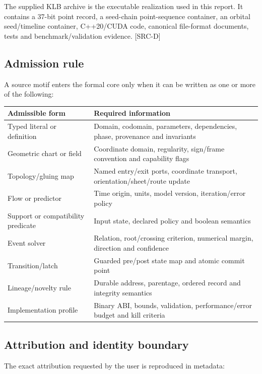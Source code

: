 \documentclass[10pt,a4paper]{article}
\newcommand{\source}[1]{\textsf{\color{TKgray}[#1]}}
\begin{document}
The supplied KLB archive is the executable realization used in this report. It contains a 37-bit point record, a seed-chain point-sequence container, an orbital seed/timeline container, C++20/CUDA code, canonical file-format documents, tests and benchmark/validation evidence. \source{SRC-D}

\subsection{Admission rule}

A source motif enters the formal core only when it can be written as one or more of the following:

\begin{center}
\begin{tabularx}{0.96\textwidth}{@{}YY@{}}
\toprule
\textbf{Admissible form} & \textbf{Required information} \\
\midrule
Typed literal or definition & Domain, codomain, parameters, dependencies, phase, provenance and invariants \\
Geometric chart or field & Coordinate domain, regularity, sign/frame convention and capability flags \\
Topology/gluing map & Named entry/exit ports, coordinate transport, orientation/sheet/route update \\
Flow or predictor & Time origin, units, model version, iteration/error policy \\
Support or compatibility predicate & Input state, declared policy and boolean semantics \\
Event solver & Relation, root/crossing criterion, numerical margin, direction and confidence \\
Transition/latch & Guarded pre/post state map and atomic commit point \\
Lineage/novelty rule & Durable address, parentage, ordered record and integrity semantics \\
Implementation profile & Binary ABI, bounds, validation, performance/error budget and kill criteria \\
\bottomrule
\end{tabularx}
\end{center}

\subsection{Attribution and identity boundary}

The exact attribution requested by the user is reproduced in metadata:
\end{document}
